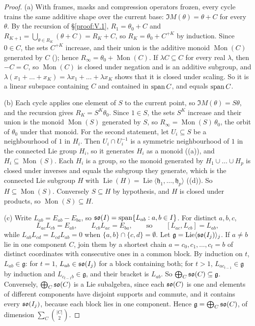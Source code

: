\begin{proof}
(a) With frames, masks and compression operators frozen, every cycle trains the same additive shape over the current
base: $\Im M(\theta)=\theta+C$ for every $\theta$. By the recursion of \S\ref{proof:V.1}, $R_1=\theta_0+C$ and
$R_{K+1}=\bigcup_{\theta\in R_K}(\theta+C)=R_K+C$, so $R_K=\theta_0+C^{+K}$ by induction. Since $0\in C$, the sets $C^{+K}$
increase, and their union is the additive monoid $\operatorname{Mon}(C)$ generated by $C$ (); hence
$R_\infty=\theta_0+\operatorname{Mon}(C)$. If $\lambda C\subseteq C$ for every real $\lambda$, then $-C=C$, so
$\operatorname{Mon}(C)$ is closed under negation and is an additive subgroup, and
$\lambda(x_1+\dots+x_K)=\lambda x_1+\dots+\lambda x_K$ shows that it is closed under scaling. So it is a linear subspace
containing $C$ and contained in $\operatorname{span} C$, and equals $\operatorname{span} C$.

(b) Each cycle applies one element of $S$ to the current point, so $\Im M(\theta)=S\theta$, and the recursion gives
$R_K=S^K\theta_0$. Since $1\in S$, the sets $S^K$ increase and their union is the monoid $\operatorname{Mon}(S)$ generated
by $S$, so $R_\infty=\operatorname{Mon}(S)\,\theta_0$, the orbit of $\theta_0$ under that monoid. For the second statement,
let $U_i\subseteq S$ be a neighbourhood of $1$ in $H_i$. Then $U_i\cap U_i^{-1}$ is a symmetric neighbourhood of $1$ in the
connected Lie group $H_i$, so it generates $H_i$ as a monoid ((a)), and $H_i\subseteq\operatorname{Mon}(S)$.
Each $H_i$ is a group, so the monoid generated by $H_1\cup\dots\cup H_p$ is closed under inverses and equals the subgroup
they generate, which is the connected Lie subgroup $H$ with $\operatorname{Lie}(H)=\operatorname{Lie}\langle\mathfrak
h_1,\dots,\mathfrak h_p\rangle$ ((d)). So $H\subseteq\operatorname{Mon}(S)$. Conversely $S\subseteq H$ by
hypothesis, and $H$ is closed under products, so $\operatorname{Mon}(S)\subseteq H$.

(c) Write $L_{ab}=E_{ab}-E_{ba}$, so $\mathfrak{so}(I)=\operatorname{span}\{L_{ab}:a,b\in I\}$. For distinct $a,b,c$,
\[L_{ac}L_{cb}=E_{ab},\qquad L_{cb}L_{ac}=E_{ba},\qquad\text{so}\qquad[L_{ac},L_{cb}]=L_{ab},\]
while $L_{ab}L_{cd}=L_{cd}L_{ab}=0$ when $\{a,b\}\cap\{c,d\}=\emptyset$. Let $\mathfrak g=\operatorname{Lie}\langle\mathfrak{so}(I_j)
\rangle_j$. If $a\ne b$ lie in one component $C$, join them by a shortest chain $a=c_0,c_1,\dots,c_t=b$ of distinct
coordinates with consecutive ones in a common block. By induction on $t$, $L_{ab}\in\mathfrak g$: for $t=1$,
$L_{ab}\in\mathfrak{so}(I_j)$ for a block containing both; for $t>1$, $L_{ac_{t-1}}\in\mathfrak g$ by induction and $L_{c_{t-1}b}\in
\mathfrak g$, and their bracket is $L_{ab}$. So $\bigoplus_C\mathfrak{so}(C)\subseteq\mathfrak g$. Conversely, $\bigoplus_C\mathfrak{so}(C)$ is a
Lie subalgebra, since each $\mathfrak{so}(C)$ is one and elements of different components have disjoint supports and commute, and it
contains every $\mathfrak{so}(I_j)$, because each block lies in one component. Hence $\mathfrak g=\bigoplus_C\mathfrak{so}(C)$, of dimension
$\sum_C\binom{\lvert C\rvert}2$.


\end{proof}
